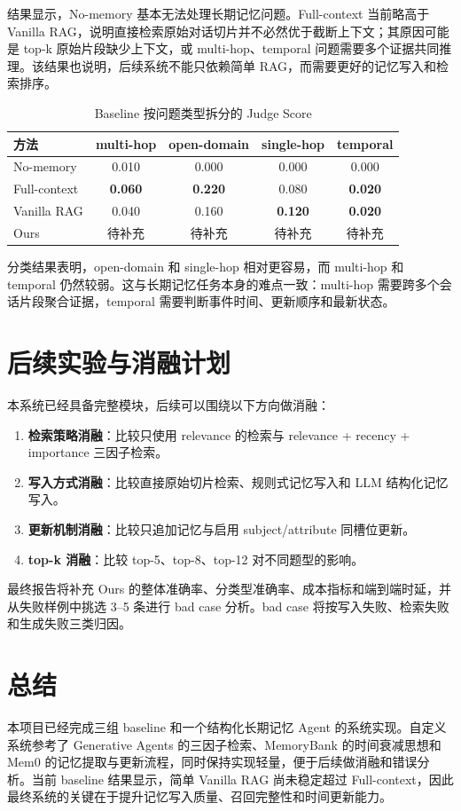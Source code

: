 \documentclass[UTF8,a4paper,11pt]{ctexart}
\begin{document}
结果显示，No-memory 基本无法处理长期记忆问题。Full-context 当前略高于 Vanilla RAG，说明直接检索原始对话切片并不必然优于截断上下文；其原因可能是 top-k 原始片段缺少上下文，或 multi-hop、temporal 问题需要多个证据共同推理。该结果也说明，后续系统不能只依赖简单 RAG，而需要更好的记忆写入和检索排序。

\begin{table}[H]
\centering
\caption{Baseline 按问题类型拆分的 Judge Score}
\label{tab:baseline-category}
\begin{tabular}{lcccc}
\toprule
方法 & multi-hop & open-domain & single-hop & temporal \\
\midrule
No-memory & 0.010 & 0.000 & 0.000 & 0.000 \\
Full-context & \textbf{0.060} & \textbf{0.220} & 0.080 & \textbf{0.020} \\
Vanilla RAG & 0.040 & 0.160 & \textbf{0.120} & \textbf{0.020} \\
Ours & 待补充 & 待补充 & 待补充 & 待补充 \\
\bottomrule
\end{tabular}
\end{table}

分类结果表明，open-domain 和 single-hop 相对更容易，而 multi-hop 和 temporal 仍然较弱。这与长期记忆任务本身的难点一致：multi-hop 需要跨多个会话片段聚合证据，temporal 需要判断事件时间、更新顺序和最新状态。

\section{后续实验与消融计划}

本系统已经具备完整模块，后续可以围绕以下方向做消融：

\begin{enumerate}
  \item \textbf{检索策略消融}：比较只使用 relevance 的检索与 relevance + recency + importance 三因子检索。
  \item \textbf{写入方式消融}：比较直接原始切片检索、规则式记忆写入和 LLM 结构化记忆写入。
  \item \textbf{更新机制消融}：比较只追加记忆与启用 subject/attribute 同槽位更新。
  \item \textbf{top-k 消融}：比较 top-5、top-8、top-12 对不同题型的影响。
\end{enumerate}

最终报告将补充 Ours 的整体准确率、分类型准确率、成本指标和端到端时延，并从失败样例中挑选 3--5 条进行 bad case 分析。bad case 将按写入失败、检索失败和生成失败三类归因。

\section{总结}

本项目已经完成三组 baseline 和一个结构化长期记忆 Agent 的系统实现。自定义系统参考了 Generative Agents 的三因子检索、MemoryBank 的时间衰减思想和 Mem0 的记忆提取与更新流程，同时保持实现轻量，便于后续做消融和错误分析。当前 baseline 结果显示，简单 Vanilla RAG 尚未稳定超过 Full-context，因此最终系统的关键在于提升记忆写入质量、召回完整性和时间更新能力。
\end{document}
